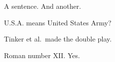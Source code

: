 A sentence. And another.

U.S.A. means United States Army?

Tinker et al.\ made the double play.

Roman number XII\@. Yes.
